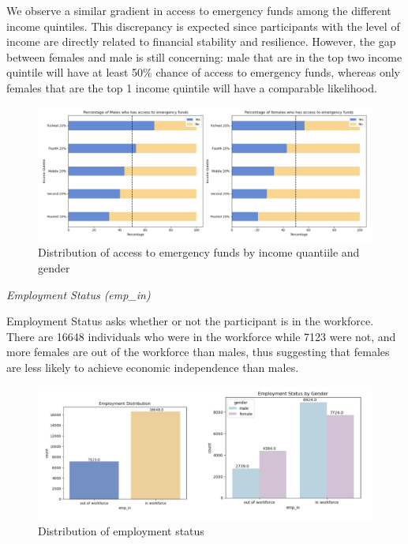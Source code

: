 \documentclass[12pt]{article}
\begin{document}
We observe a similar gradient in access to emergency funds among the
different income quintiles. This discrepancy is expected since
participants with the level of income are directly related to financial
stability and resilience. However, the gap between females and male is
still concerning: male that are in the top two income quintile will have
at least 50\% chance of access to emergency funds, whereas only females
that are the top 1 income quintile will have a comparable likelihood.

\begin{figure}

{\centering \includegraphics[width=1\linewidth]{graphs/employ_graph7} 

}

\caption{Distribution of access to emergency funds by income quantiile and gender}\label{fig:unnamed-chunk-10}
\end{figure}

\emph{Employment Status (emp\_in)}

Employment Status asks whether or not the participant is in the
workforce. There are 16648 individuals who were in the workforce while
7123 were not, and more females are out of the workforce than males,
thus suggesting that females are less likely to achieve economic
independence than males.

\begin{figure}

{\centering \includegraphics[width=1\linewidth]{graphs/employ_graph8} 

}

\caption{Distribution of employment status}\label{fig:unnamed-chunk-11}
\end{figure}
\end{document}
